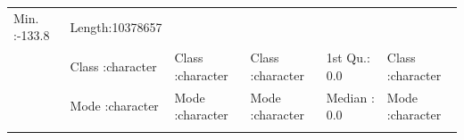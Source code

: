 \documentclass[]{article}
\begin{document}
\begin{longtable}[]{@{}llllll@{}}
\begin{minipage}[t]{0.14\columnwidth}
Min. :-133.8\strut
\end{minipage} & \begin{minipage}[t]{0.16\columnwidth}\raggedright\strut
Length:10378657\strut
\end{minipage}\tabularnewline
\begin{minipage}[t]{0.04\columnwidth}\raggedright\strut
\strut
\end{minipage} & \begin{minipage}[t]{0.16\columnwidth}\raggedright\strut
Class :character\strut
\end{minipage} & \begin{minipage}[t]{0.16\columnwidth}\raggedright\strut
Class :character\strut
\end{minipage} & \begin{minipage}[t]{0.16\columnwidth}\raggedright\strut
Class :character\strut
\end{minipage} & \begin{minipage}[t]{0.14\columnwidth}\raggedright\strut
1st Qu.: 0.0\strut
\end{minipage} & \begin{minipage}[t]{0.16\columnwidth}\raggedright\strut
Class :character\strut
\end{minipage}\tabularnewline
\begin{minipage}[t]{0.04\columnwidth}\raggedright\strut
\strut
\end{minipage} & \begin{minipage}[t]{0.16\columnwidth}\raggedright\strut
Mode :character\strut
\end{minipage} & \begin{minipage}[t]{0.16\columnwidth}\raggedright\strut
Mode :character\strut
\end{minipage} & \begin{minipage}[t]{0.16\columnwidth}\raggedright\strut
Mode :character\strut
\end{minipage} & \begin{minipage}[t]{0.14\columnwidth}\raggedright\strut
Median : 0.0\strut
\end{minipage} & \begin{minipage}[t]{0.16\columnwidth}\raggedright\strut
Mode :character\strut
\end{minipage}\tabularnewline
\begin{minipage}[t]{0.04\columnwidth}\raggedright\strut
\strut
\end{minipage} & \begin{minipage}[t]{0.16\columnwidth}\raggedright\strut

\end{minipage}
\end{longtable}
\end{document}
